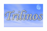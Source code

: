 \documentclass[11pt,twoside,titlepage]{EpetraDoc}
\begin{document}
\vspace*{\fill}
\includegraphics[height=0.5in]{trilinos.eps}
\hfill

\cleardoublepage
\tableofcontents

\cleardoublepage
\listoffigures

\cleardoublepage
\listoftables

\clearpage



\cleardoublepage
%
%

\cleardoublepage
\printindex
%
\end{document}
